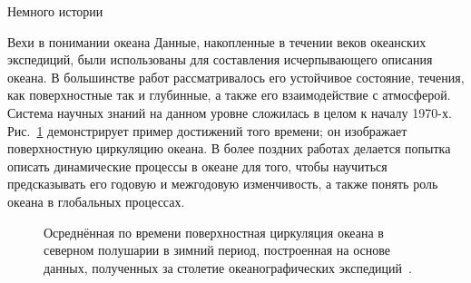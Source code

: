 \begin{chapter}{Немного истории}
\begin{section}{Вехи в понимании океана}
Данные, накопленные в течении веков океанских экспедиций, были
использованы для составления исчерпывающего описания океана.
В большинстве работ рассматривалось его устойчивое состояние, 
течения, как поверхностные так и глубинные, а также его взаимодействие с
атмосферой. Система научных знаний на данном уровне сложилась в целом   
к началу 1970-х. Рис.~\ref{fig:Fig2-8} демонстрирует пример достижений того 
времени; он изображает поверхностную циркуляцию океана. 
В более поздних работах делается попытка описать динамические
процессы в океане для того, чтобы научиться предсказывать его годовую и
межгодовую изменчивость, а также понять роль океана в глобальных
процессах.
%

\begin{figure}[t!]
\caption{Осреднённая по времени поверхностная циркуляция океана в северном 
полушарии в зимний период, построенная на основе данных, полученных 
за столетие океанографических экспедиций~\cite{Tolmazin:1985}.}
\label{fig:Fig2-8}
\end{figure}
%
%
\end{section}


\end{chapter}
